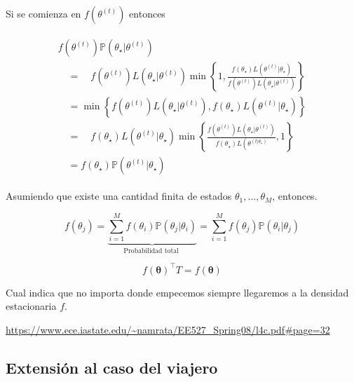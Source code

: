 \documentclass[
  12pt,
]{book}
\theoremstyle{definition}
\theoremstyle{definition}
\theoremstyle{definition}
\theoremstyle{remark}
\begin{document}
Si se comienza en \(f\left(\theta^{(t)}\right)\) entonces

\begin{align}
\begin{array}{l}
f\left(\theta^{(t)}\right) \mathbb{P}\left(\theta_{\star} | \theta^{(t)}\right) \\
\quad=\quad f\left(\theta^{(t)}\right) L\left(\theta_{\star} | \theta^{(t)}\right) \min \left\{1, \frac{f\left(\theta_{\star}\right) L\left(\theta^{(t)} | \theta_{\star}\right)}{f\left(\theta^{(t)}\right) L\left(\theta_{\star} | \theta^{(t)}\right)}\right\} \\
\quad=\min \left\{f\left(\theta^{(t)}\right) L\left(\theta_{\star} | \theta^{(t)}\right), f\left(\theta_{\star}\right) L\left(\theta^{(t)} | \theta_{\star}\right)\right\} \\
\quad=\quad f\left(\theta_{\star}\right) L\left(\theta^{(t)} | \theta_{\star}\right) \min \left\{\frac{f\left(\theta^{(t)}\right) L\left(\theta_{\star} | \theta^{(t)}\right)}{f\left(\theta_{\star}\right) L\left(\theta^{\left(t | \theta_{\star}\right)}\right.}, 1\right\} \\
\quad=f\left(\theta_{\star}\right) \mathbb{P}\left(\theta^{(t)} | \theta_{\star}\right)
\end{array}
\end{align}

Asumiendo que existe una cantidad finita de estados \(\theta_{1}, \ldots, \theta_{M}\), entonces.

\begin{equation*}
f\left(\theta_{j}\right) = \underbrace{\sum_{i=1}^{M} f\left(\theta_{i}\right) \mathbb{P} \left(\theta_{j} | \theta_{i}\right)}_{\text {Probabilidad total  }}=\sum_{i=1}^{M} f\left(\theta_{j}\right) \mathbb{P} \left(\theta_{i} | \theta_{j}\right)
\end{equation*}

\begin{equation}
f(\boldsymbol{\theta})^\top T =   f(\boldsymbol{\theta})
\end{equation}

Cual indica que no importa donde empecemos siempre llegaremos a la densidad estacionaria \(f\).

\url{https://www.ece.iastate.edu/~namrata/EE527_Spring08/l4c.pdf\#page=32}

\hypertarget{extensiuxf3n-al-caso-del-viajero}{%
\subsection{Extensión al caso del viajero}\label{extensiuxf3n-al-caso-del-viajero}}
\end{document}
